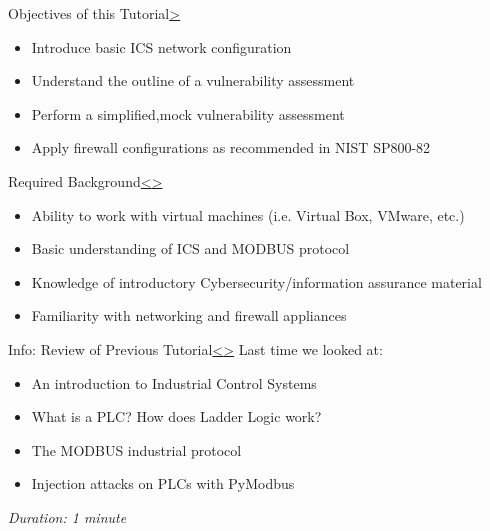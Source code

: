 \documentclass[12pt]{extarticle}
\newenvironment{instructionblock}{\Large\bgroup}{\egroup}
\newcommand{\bi}{\begin{itemize}}
\newcommand{\ei}{\end{itemize}}
\newcounter{next}
\newcounter{prev}
\begin{document}
	\pagebreak
	\setcounter{section}{1}
	\begin{slide}{Objectives of this Tutorial}{\hyperref[slide \thenext]{\textgreater}}
		\begin{instructionblock}
				\bi 
					\item Introduce basic ICS network configuration
					\item Understand the outline of a vulnerability assessment
					\item Perform a simplified,mock vulnerability assessment
					\item Apply firewall configurations as recommended in NIST SP800-82
				\ei
		\end{instructionblock}
	\end{slide}
	
	
	
	
	\pagebreak
	\begin{slide}{Required Background}{\hyperref[slide \theprev]{\textless}\hyperref[slide \thenext]{\textgreater}}
		\begin{instructionblock}
			\bi
				\item Ability to work with virtual machines (i.e. Virtual Box, VMware, etc.)
				\item Basic understanding of ICS and MODBUS protocol
				\item Knowledge of introductory Cybersecurity/information assurance material
				\item Familiarity with networking and firewall appliances
			\ei
		\end{instructionblock}
	\end{slide}
	
	\pagebreak
	



\pagebreak
{}
\begin{slide}{Info: Review of Previous Tutorial}{\hyperref[slide \theprev]{\textless}\hyperref[slide \thenext]{\textgreater}}
	\begin{instructionblock}
		Last time we looked at:
		\bi
			\item An introduction to Industrial Control Systems
			\item What is a PLC? How does Ladder Logic work?
			\item The MODBUS industrial protocol
			\item Injection attacks on PLCs with PyModbus
		\ei
	\end{instructionblock}
\end{slide}
\textit{Duration: 1 minute}
\vfill
\noindent
\pagebreak
\end{document}
